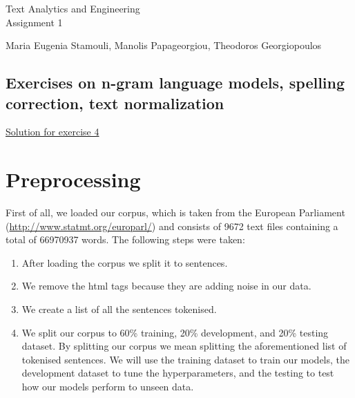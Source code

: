 \documentclass[12pt]{article}
\begin{document}
\begin{center}
{\Large Text Analytics and Engineering}\\

\Large Assignment 1 %
\end{center}

\vspace{0.2 cm}
\large{Maria Eugenia Stamouli, Manolis Papageorgiou, Theodoros Georgiopoulos}

\vspace{0.2 cm}
\subsection*{Exercises on n-gram language models, spelling correction, text normalization}
\vspace{0.2 cm}

{\underline{\large Solution for exercise 4}}
\vspace{0.1 cm}

\section{Preprocessing}

First of all, we loaded our corpus, which is taken from the European Parliament (\href{http://www.statmt.org/europarl/}{http://www.statmt.org/europarl/}) and consists of 9672 text files containing a total of 66970937 words. The following steps were taken:

\begin{enumerate}[Step 1:]
	\item After loading the corpus we split it to sentences.
	\item We remove the html tags because they are adding noise in our data.
	\item We create a list of all the sentences tokenised.
	\item We split our corpus to 60\% training, 20\% development, and 20\% testing dataset. By splitting our corpus we mean splitting the aforementioned list of tokenised sentences. We will use the training dataset to train our models, the development dataset to tune the hyperparameters, and the testing to test how our models perform to unseen data.
\end{enumerate}
\end{document}
